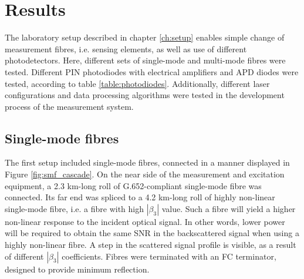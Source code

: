 \documentclass{standalone}
\begin{document}
\chapter{Results}
\setcounter{page}\thestranica


The laboratory setup described in chapter \ref{ch:setup} enables simple change of measurement fibres, i.e. sensing elements, as well as use of different photodetectors. Here, different sets of single-mode and multi-mode fibres were tested. Different PIN photodiodes with electrical amplifiers and APD diodes were tested, according to table \ref{table:photodiodes}. Additionally, different laser configurations and data processing algorithms were tested in the development process of the measurement system.

\section{Single-mode fibres}

The first setup included single-mode fibres, connected in a manner displayed in Figure \ref{fig:smf_cascade}.
On the near side of the measurement and excitation equipment, a 2.3 km-long roll of G.652-compliant single-mode fibre was connected. Its far end was spliced to a 4.2 km-long roll of highly non-linear single-mode fibre, i.e. a fibre with high $\left|\beta_3\right|$ value. Such a fibre will yield a higher non-linear response to the incident optical signal. In other words, lower power will be required to obtain the same SNR in the backscattered signal when using a highly non-linear fibre. A step in the scattered signal profile is visible, as a result of different $\left|\beta_3\right|$ coefficients. Fibres were terminated with an FC terminator, designed to provide minimum reflection. \\
\end{document}
